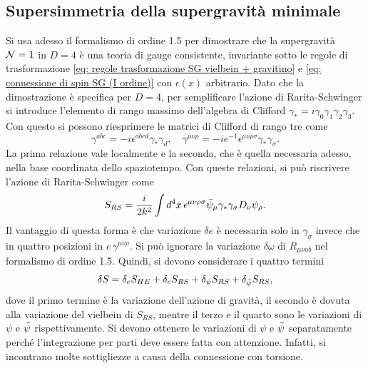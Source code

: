 \subsection{Supersimmetria della supergravità minimale}
Si usa adesso il formalismo di ordine 1.5 per dimostrare che la supergravità $\mathcal{N} = 1$ in $D = 4$ è una teoria di gauge consistente, invariante sotto le regole di trasformazione \eqref{eq: regole trasformazione SG vielbein + gravitino} e \eqref{eq: connessione di spin SG (I ordine)} con $\epsilon(x)$ arbitrario. Dato che la dimostrazione è specifica per $D = 4$, per semplificare l'azione di Rarita-Schwinger si introduce l'elemento di rango massimo dell'algebra di Clifford $\gamma_* = i\gamma_0\gamma_1\gamma_2\gamma_3$. Con questo si possono riesprimere le matrici di Clifford di rango tre come 
\begin{equation}
    \gamma^{abc} = -i\epsilon^{abcd}\gamma_*\gamma_d,\quad \gamma^{\mu\nu\rho} = -ie^{-1}\epsilon^{\mu\nu\rho\sigma}\gamma_*\gamma_\sigma.
\end{equation}
La prima relazione vale localmente e la seconda, che è quella necessaria adesso, nella base coordinata dello spaziotempo. Con queste relazioni, si può riscrivere l'azione di Rarita-Schwinger come 
\begin{equation}
    S_{RS} = \frac{i}{2k^2}\int d^4x\,\epsilon^{\mu\nu\rho\sigma}\bar{\psi}_\mu\gamma_*\gamma_\sigma D_\nu\psi_\rho.
\end{equation}
Il vantaggio di questa forma è che variazione $\delta e$ è necessaria solo in $\gamma_\sigma$ invece che in quattro posizioni in $e\,\gamma^{\mu\nu\rho}$. Si può ignorare la variazione $\delta\omega$ di $R_{\mu\nu ab}$ nel formalismo di ordine 1.5. Quindi, si devono considerare i quattro termini
\begin{equation}
    \delta S = \delta_e S_{HE} + \delta_e S_{RS} + \delta_\psi S_{RS} + \delta_{\bar{\psi}}S_{RS},
\end{equation}
dove il primo termine è la variazione dell'azione di gravità, il secondo è dovuta alla variazione del vielbein di $S_{RS}$, mentre il terzo e il quarto sono le variazioni di $\psi$ e $\bar{\psi}$ rispettivamente. Si devono ottenere le variazioni di $\psi$ e $\bar{\psi}$ separatamente perché l'integrazione per parti deve essere fatta con attenzione. Infatti, si incontrano molte sottigliezze a causa della connessione con torsione. 

